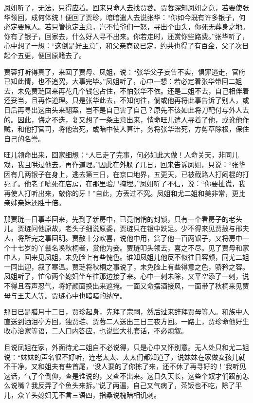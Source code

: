 \documentclass[12pt,oneside]{book}
\begin{document}
凤姐听了，无法，只得应着。回来只命人去找贾蓉。贾蓉深知凤姐之意，若要使张华领回，成何体统！便回了贾珍，暗暗遣人去说张华：“你如今既有许多银子，何必定要原人。若只管执定主意，岂不怕爷们一怒，寻出个由头，你死无葬身之地。你有了银子，回家去，什么好人寻不出来。你若走时，还赏你些路费。”张华听了，心中想了一想：“这倒是好主意”，和父亲商议已定，约共也得了有百金，父子次日起个五更，便回原籍去了。

贾蓉打听得真了，来回了贾母、凤姐，说：“张华父子妄告不实，惧罪逃走，官府已知此情，也不追究，大事完毕。”凤姐听了，心中一想：若必定着张华带回二姐去，未免贾琏回来再花几个钱包占住，不怕张华不依。还是二姐不去，自己相伴着还妥当，且再作道理。只是张华此去，不知何往，倘或他再将此事告诉了别人，或日后再寻出这由头来翻案，岂不是自己害了自己？原先不该如此将刀靶付与外人去的。因此，悔之不迭，复又想了一条主意出来，悄命旺儿遣人寻着了他，或讹他作贼，和他打官司，将他治死，或暗中使人算计，务将张华治死，方剪草除根，保住自己的名誉。

旺儿领命出来，回家细想：“人已走了完事，何必如此大做！人命关天，非同儿戏，我且哄过他去，再作道理。”因此在外躲了几日，回来告诉凤姐，只说：“张华因有几两银子在身上，逃去第三日，在京口地界，五更天，已被截路人打闷棍的打死了。他老子唬死在店房，在那里验尸掩埋。”凤姐听了不信，说：“你要扯谎，我再使人打听出来，敲你的牙！”自此，方丢过不究。凤姐和尤二姐和美非常，更比亲姊亲妹还胜十倍。

那贾琏一日事毕回来，先到了新房中，已竟悄悄的封锁，只有一个看房子的老头儿。贾琏问他原故，老头子细说原委，贾琏只在镫中跌足。少不得来见贾赦与邢夫人，将所完之事回明。贾赦十分欢喜，说他中用，赏了他一百两银子，又将房中一个十七岁的丫鬟名唤秋桐者，赏他为妾。贾琏叩头领去，喜之不尽。见了贾母和家中人，回来见凤姐，未免脸上有些愧色。谁知凤姐儿他反不似往日容颜，同尤二姐一同出迎，叙了寒温。贾琏将秋桐之事说了，未免脸上有些得意之色，骄矜之容。凤姐听了，忙命两个媳妇坐车往那边接了来。心中一刺未除，又平空添了一刺，说不得且吞声忍气，将好颜面换出来遮掩。一面又命摆酒接风，一面带了秋桐来见贾母与王夫人等。贾琏心中也暗暗的纳罕。

那日已是腊月十二日，贾珍起身，先拜了宗祠，然后过来辞拜贾母等人。和族中人直送到洒泪亭方回，独贾琏、贾蓉二人送出三日三夜方回。一路上，贾珍命他好生收心治家等语，二人口内答应，也说些大礼套话，不必烦叙。

且说凤姐在家，外面待尤二姐自不必说得，只是心中又怀别意。无人处只和尤二姐说：“妹妹的声名很不好听，连老太太、太太们都知道了，说妹妹在家做女孩儿就不干净，又和姐夫有些首尾，‘没人要的了你拣了来，还不休了再寻好的！’我听见这话，气了个倒仰，查是谁说的，又查不出来。这日久天长，这些个奴才们跟前怎么说嘴？我反弄了个鱼头来拆。”说了两遍，自己又气病了，茶饭也不吃，除了平儿，众丫头媳妇无不言三语四，指桑说槐暗相讥刺。
\end{document}
